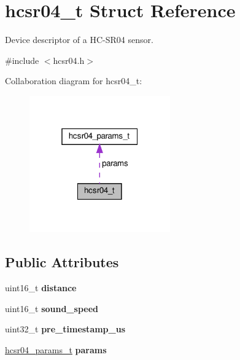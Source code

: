 \hypertarget{structhcsr04__t}{}\section{hcsr04\+\_\+t Struct Reference}
\label{structhcsr04__t}


Device descriptor of a H\+C-\/\+S\+R04 sensor.  




{\ttfamily \#include $<$hcsr04.\+h$>$}



Collaboration diagram for hcsr04\+\_\+t\+:\nopagebreak
\begin{figure}[H]
\begin{center}
\leavevmode
\includegraphics[width=172pt]{structhcsr04__t__coll__graph}
\end{center}
\end{figure}
\subsection*{Public Attributes}
\begin{DoxyCompactItemize}
\item 
\mbox{\label{structhcsr04__t_af64d397e8f9cc4ff94941a329499812c}} 
uint16\+\_\+t {\bfseries distance}
\item 
\mbox{\label{structhcsr04__t_a644861537571d22723be0ece37ebdbe6}} 
uint16\+\_\+t {\bfseries sound\+\_\+speed}
\item 
\mbox{\label{structhcsr04__t_aaf349923d0f2ee16de5e9bfc635e3299}} 
uint32\+\_\+t {\bfseries pre\+\_\+timestamp\+\_\+us}
\item 
\mbox{\label{structhcsr04__t_a87a029d684f303b03e6139964fd7086a}} 
\hyperlink{structhcsr04__params__t}{hcsr04\+\_\+params\+\_\+t} {\bfseries params}
\end{DoxyCompactItemize}


